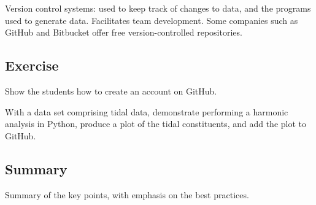 \documentclass[a4paper,11pt]{article}
\begin{document}
Version control systems: used to keep track of changes to data, and the programs used to generate data. Facilitates team development. Some companies such as GitHub and Bitbucket offer free version-controlled repositories.

\subsection{Exercise}
Show the students how to create an account on GitHub.

With a data set comprising tidal data, demonstrate performing a harmonic analysis in Python, produce a plot of the tidal constituents, and add the plot to GitHub.

\subsection{Summary}
Summary of the key points, with emphasis on the best practices.
\end{document}

